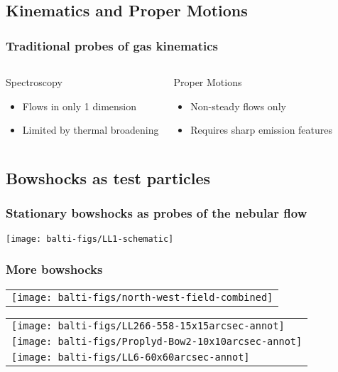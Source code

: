 \documentclass[presentation]{beamer}
\begin{document}
\subsection{Kinematics and Proper Motions}
\begin{frame}
  \frametitle{Traditional probes of gas kinematics}
  \begin{columns}
    \begin{block}{Spectroscopy}
      \begin{itemize}
      \item Flows in only 1 dimension
      \item Limited by thermal broadening
      \end{itemize}
    \end{block}
    \begin{block}{Proper Motions}
      \begin{itemize}
      \item Non-steady flows only
      \item Requires sharp emission features
      \end{itemize}
    \end{block}
  \end{columns}
\end{frame}

\subsection{Bowshocks as test particles}

\begin{frame}
  \frametitle{Stationary bowshocks as probes of the nebular flow}
  \texttt{[image: balti-figs/LL1-schematic]}
\end{frame}

\begin{frame}
  \frametitle{More bowshocks}
  \renewcommand\arraystretch{0}
  \setlength\tabcolsep{0pt}
  \begin{tabular}{l}
    \texttt{[image: balti-figs/north-west-field-combined]}\\
  \end{tabular}%
  \begin{tabular}{l}
    \texttt{[image: balti-figs/LL266-558-15x15arcsec-annot]}\\
    \texttt{[image: balti-figs/Proplyd-Bow2-10x10arcsec-annot]}\\
    \texttt{[image: balti-figs/LL6-60x60arcsec-annot]}\\
  \end{tabular}
\end{frame}
\end{document}

